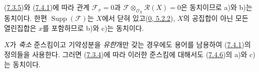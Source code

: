 (\hyperref[I.7.3.5-ko]{7.3.5})와
(\hyperref[I.7.4.1-ko]{7.4.1})에 따라 관계 $\mathscr{F}_x=0$과
$\mathscr{F}\otimes_{\mathscr{O}_X}\mathscr{R}(X)=0$은 동치이므로
a)와 b)는 동치이다. 한편 $\operatorname{Supp}(\mathscr{F})$는
$X$에서 닫혀 있고(\hyperref[0.5.2.2-ko]{0, 5.2.2}), $X$의 공집합이
아닌 모든 열린집합은 $x$를 포함하므로 b)와 c)는 동치이다.

\begin{env}[7.4.7]
\label{I.7.4.7-ko}
$X$가 \emph{축소} 준스킴이고 기약성분을 \emph{유한}개만 갖는 경우에도
용어를 남용하여 (\hyperref[I.7.4.1-ko]{7.4.1})의 정의들을 사용한다.
그러면 (\hyperref[I.7.3.4-ko]{7.3.4})에 따라 이러한 준스킴에 대해서도
(\hyperref[I.7.4.6-ko]{7.4.6})의 a)와 c)는 동치이다.
\end{env}
